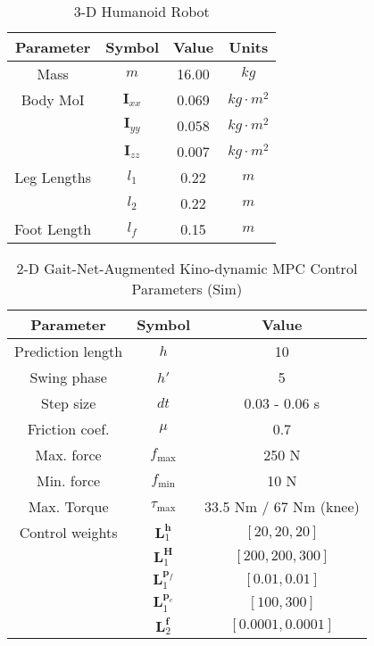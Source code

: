 \begin{table}[H]
	\vspace{0.2cm}
	\centering
        \caption{3-D Humanoid Robot}
	\begin{tabular}{cccc}
		\hline
		Parameter & Symbol & Value & Units\\
		\hline
		Mass & $m$    & 16.00 & $\unit{kg}$  \\
		Body MoI  & $\bm I_{xx}$  & 0.069 & $\unit{kg}\cdot \unit{m}^2$ \\
		& $\bm I_{yy}$ & 0.058  & $\unit{kg}\cdot \unit{m}^2$ \\
		& $\bm I_{zz}$ & 0.007  & $\unit{kg}\cdot \unit{m} ^2$ \\
		Leg Lengths & $l_1$    & 0.22 & 
          $\unit{m}$  \\
          & $l_2$    & 0.22 & $\unit{m}$  \\
		 Foot Length & $l_{f}$    & 0.15 & $\unit{m}$  \\
		\hline 
	\end{tabular}
    \vspace{0.2cm}
\end{table}	


\begin{table}[H]
	\vspace{0.2cm}
	\centering
	\caption{2-D Gait-Net-Augmented  Kino-dynamic MPC Control Parameters (Sim)}
	\begin{tabular}{ccc}
	\hline
	Parameter & Symbol & Value \\
	\hline
	Prediction length & $h$  &  10 \\
        Swing phase & $h'$ & 5 \\
        Step size & $dt$  &  0.03 - 0.06 s \\
        Friction coef. & $\mu$  &  0.7 \\
        Max. force & $f_\text{max}$  &  250 N \\
        Min. force & $f_\text{min}$  &  10 N \\
        Max. Torque & $\tau_\text{max}$ & 33.5 Nm / 67 Nm (knee)\\
        Control weights & $\bm L_1^{\bm h}$  &  $[20, 20, 20]$ \\
        & $\bm L_1^{\bm H}$ & $[200, 200, 300]$ \\
        & $\bm L_1^{\bm {p}_f}$ & $[0.01, 0.01]$ \\
        & $\bm L_1^{\bm {p}_c}$ & $[100, 300]$ \\
        & $\bm L_2^{\bm f}$ & $[0.0001, 0.0001]$ \\
	\hline 
	\end{tabular}
	\vspace{0.2cm}
\end{table}	

